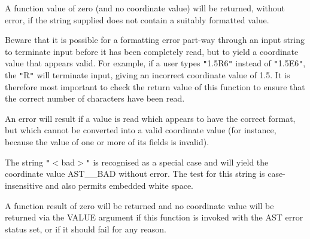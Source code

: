 \documentclass[twoside,11pt]{article}
\begin{document}
{{{         \sstitem
         A function value of zero (and no coordinate value) will be
         returned, without error, if the string supplied does not contain
         a suitably formatted value.

         \sstitem
         Beware that it is possible for a formatting error part-way
         through an input string to terminate input before it has been
         completely read, but to yield a coordinate value that appears
         valid. For example, if a user types {\tt{"}}1.5R6{\tt{"}} instead of {\tt{"}}1.5E6{\tt{"}},
         the {\tt{"}}R{\tt{"}} will terminate input, giving an incorrect coordinate
         value of 1.5. It is therefore most important to check the return
         value of this function to ensure that the correct number of
         characters have been read.

         \sstitem
         An error will result if a value is read which appears to have
         the correct format, but which cannot be converted into a valid
         coordinate value (for instance, because the value of one or more
         of its fields is invalid).

         \sstitem
         The string {\tt{"}}$<$bad$>${\tt{"}} is recognised as a special case and will
         yield the coordinate value AST\_\_BAD without error. The test for
         this string is case-insensitive and also permits embedded white
         space.

         \sstitem
         A function result of zero will be returned and no coordinate
         value will be returned via the VALUE argument if this function
         is invoked with the AST error status set, or if it should fail
         for any reason.
      }
   }
   }
\end{document}
